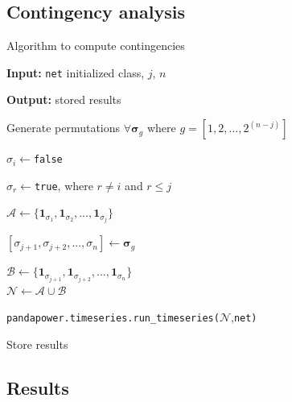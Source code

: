 \subsection{Contingency analysis}
\begin{frame}{Algorithm to compute contingencies}

\begin{algorithm}[H]
\DontPrintSemicolon
  

  \textbf{Input:} \texttt{net} initialized class, $j$, $n$

  \textbf{Output:} stored results

  Generate permutations $\forall \bm{\sigma}_{g}$ where $g=[1,2,...,2^{(n-j)}]$

  {
    $\sigma_i\gets$\texttt{false}

    $\sigma_r\gets$\texttt{true}, where $r\neq i$ and $r\leq j$

    $\mathcal{A}\gets \{\mathbf{1}_{\sigma_{1}}, \mathbf{1}_{\sigma_{2}},..., \mathbf{1}_{\sigma_{j}}\}$\\

    {
      $[\sigma_{j+1}, \sigma_{j+2},..., \sigma_n] \gets \bm{\sigma}_g$

    $\mathcal{B} \gets \{\mathbf{1}_{\sigma_{j+1}}, \mathbf{1}_{\sigma_{j+2}},..., \mathbf{1}_{\sigma_{n}}\}$\\

    $\mathcal{N} \gets \mathcal{A} \cup \mathcal{B}$

    \texttt{pandapower.timeseries.run\_timeseries(}$\mathcal{N}$,\texttt{net)}

    Store results
    }
  }
\caption{Pseudocode to solve the contingencies}
\label{alg:1}
\end{algorithm}

\end{frame}


\subsection{Results}

